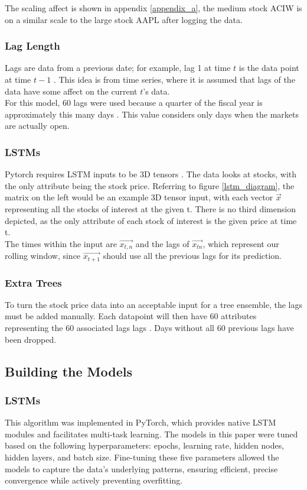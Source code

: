 \documentclass[conference]{IEEEtran}
\begin{document}
The scaling affect is shown in appendix \ref{appendix_a}, the medium stock ACIW is on a similar scale to the large 
stock AAPL after logging the data.
\subsubsection*{Lag Length}
Lags are data from a previous date; for example, lag 1 at time $t$ is the data point at time $ t-1$ \cite{slater}.
This idea is from time series, where it is assumed that lags of the data have some affect on the current $t$'s data. \\
For this model, 60 lags were used because a quarter of the fiscal year is approximately this many days \cite{stockgro}. This value considers
only days when the markets are actually open.

\subsubsection*{LSTMs}
Pytorch requires LSTM inputs to be 3D tensors \cite{3d_tensor_lstm}. The data looks at stocks, with the only attribute 
being the stock price. Referring to figure \ref{lstm_diagram}, the matrix on the left would be an example 3D tensor input,
with each vector $\vec{x}$ representing all the stocks of interest at the given t. There is no third dimension depicted,
as the only attribute of each stock of interest is the given price at time t. \\
The times within the input are $\vec{x_{t,n}}$ and the lags of $\vec{x_{tn}}$, which represent our rolling window,
 since $\vec{x_{t+1}}$ should use all the previous lags for its prediction.
\subsubsection*{Extra Trees}
To turn the stock price data into an acceptable input for a tree ensemble, the lags must be added manually.
Each datapoint will then have 60 attributes representing the 60 associated lags
lags \cite{timeseries_data}. Days without all 60 previous lags have been dropped.

\subsection{Building the Models}
\subsubsection*{LSTMs}
This algorithm was implemented in PyTorch, which provides native LSTM modules and facilitates multi-task learning.
The models in this paper were tuned based on the following hyperparameters: epochs, learning rate, hidden nodes, hidden layers,
and batch size. Fine-tuning these five parameters allowed the models to capture the data’s underlying patterns, ensuring
efficient, precise convergence while actively preventing overfitting.
\end{document}

